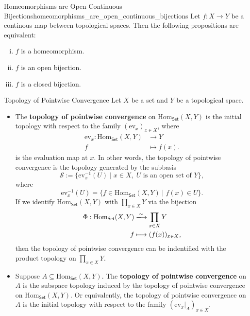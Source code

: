 \documentclass{report}
\begin{document}
\begin{proposition}{Homeomorphisms are Open Continuous Bijections}{homeomorphisms_are_open_continuous_bijections}
	Let $f:X\to Y$ be a continous map between topological spaces. Then the following propositions are equivalent:
	\begin{enumerate}[(i)]
		\item $f$ is a homeomorphism.
		\item $f$ is an open bijection.
		\item $f$ is a closed bijection.
	\end{enumerate}
\end{proposition}

\begin{definition}{Topology of Pointwise Convergence}{}
	Let $X$ be a set and $Y$ be a topological space. 
	\begin{itemize}
		\item The \textbf{topology of pointwise convergence} on $\mathrm{Hom}_{\mathsf{Set}}(X,Y)$ is the initial topology with respect to the family $\left( \mathrm{ev}_x \right)_{x\in X}$, where 
		\begin{align*}
			\mathrm{ev}_x:\mathrm{Hom}_{\mathsf{Set}}(X,Y)&\longrightarrow Y\\
			f&\longmapsto f(x).
		\end{align*}
		is the evaluation map at $x$. In other words, the topology of pointwise convergence is the topology generated by the subbasis
		\[
		\mathcal{S}:=\{\mathrm{ev}_x^{-1}(U)\mid x\in X, \;U\text{ is an open set of }Y\},
		\]
		where
		\[
			\mathrm{ev}_x^{-1}(U)=\{f\in \mathrm{Hom}_{\mathsf{Set}}(X,Y)\mid f(x)\in U\}.
		\]
		If we identify $\mathrm{Hom}_{\mathsf{Set}}(X,Y)$ with $\prod\limits_{x\in X}Y$ via the bijection 
		\begin{align*}
		\Phi:\mathrm{Hom}_{\mathsf{Set}}(X,Y)&\xlongrightarrow{\sim} \prod_{x\in X}Y\\	
		f&\longmapsto (f(x))_{x\in X}, 
		\end{align*}
		then the topology of pointwise convergence can be indentified with the product topology on $\prod\limits_{x\in X}Y$.
		\item Suppose $A\subseteq \mathrm{Hom}_{\mathsf{Set}}(X,Y)$. The \textbf{topology of pointwise convergence} on $A$ is the subspace topology induced by the topology of pointwise convergence on $\mathrm{Hom}_{\mathsf{Set}}(X,Y)$. Or equivalently, the topology of pointwise convergence on $A$ is the initial topology with respect to the family $\left( \mathrm{ev}_x|_{A} \right)_{x\in X}$.
	\end{itemize}
\end{definition}
\end{document}
